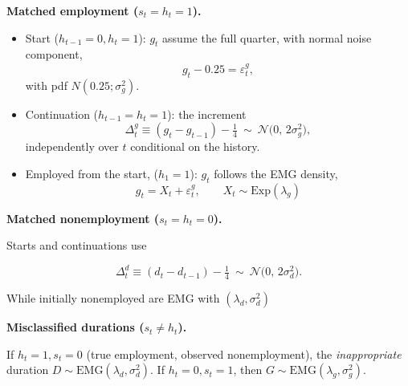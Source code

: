 \documentclass[12pt]{article}
\begin{document}
\textbf{Matched employment (\(s_{t}=h_t=1\)).}

\begin{itemize}\itemsep4pt

\item Start (\(h_{t-1}=0,h_t=1\)): \(g_{t}\) assume the full quarter, with normal noise component,
\[
g_{t} -0.25 = \varepsilon^g_{t},
\]
with pdf \(N(0.25;\sigma_g^2)\).



\item Continuation (\(h_{t-1}=h_t=1\)): the increment
\begin{equation}
\Delta^g_{t} \equiv (g_{t}-g_{t-1}) - \tfrac{1}{4} \ \sim\ \mathcal{N}\!\big(0,\,2\sigma_g^2\big),
\label{eq:emp_increment}
\end{equation}
independently over \(t\) conditional on the history.

\item Employed from the start, (\(h_{1}=1\)): \(g_{t}\) follows the EMG density,
\[
g_{t} = X_{t} + \varepsilon^g_{t},\qquad X_{t}\sim \mathrm{Exp}(\lambda_g )
\]
\end{itemize}




\textbf{Matched nonemployment (\(s_{t}=h_t=0\)).}

Starts and continuations use

\begin{equation}
\Delta^d_{t} \equiv (d_{t}-d_{t-1}) - \tfrac{1}{4} \ \sim\ \mathcal{N}\!\big(0,\,2\sigma_d^2\big).
\label{eq:nonemp_increment}
\end{equation}

While initially nonemployed are EMG with \((\lambda_d,\sigma_d^2)\)

\textbf{Misclassified durations (\(s_{t}\neq h_t\)).}

If \(h_t=1,s_{t}=0\) (true employment, observed nonemployment), the \emph{inappropriate} duration \(D\sim\mathrm{EMG}(\lambda_d, \sigma_d^2)\). If \(h_t=0,s_{t}=1\), then \(G\sim\mathrm{EMG}(\lambda_g, \sigma_g^2)\).
\end{document}

